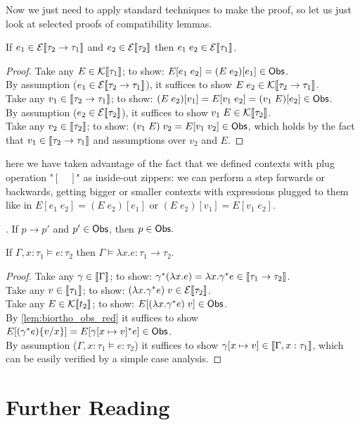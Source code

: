 Now we just need to apply standard techniques to make the proof, so let us just
look at selected proofs of compatibility lemmas.
\begin{lemma}
  If $e_1 \in \mathcal{E}\llbracket\tau_2 \to \tau_1\rrbracket$
  and $e_2 \in \mathcal{E}\llbracket\tau_2\rrbracket$
  then $e_1\;e_2 \in \mathcal{E}\llbracket\tau_1\rrbracket$.
\end{lemma}
\begin{proof}
  Take any $E \in \mathcal{K}\llbracket\tau_1\rrbracket$;
    to show: $E[e_1\;e_2] = (E\;e_2)[e_1] \in \mathsf{Obs}$. \\
  By assumption ($e_1 \in \mathcal{E}\llbracket\tau_2 \to \tau_1\rrbracket$),
    it suffices to show $E\;e_2 \in \mathcal{K}\llbracket\tau_2 \to \tau_1\rrbracket$. \\
  Take any $v_1 \in \llbracket\tau_2 \to \tau_1\rrbracket$;
    to show: $(E\;e_2)[v_1] = E[v_1\;e_2] = (v_1\;E)[e_2] \in \mathsf{Obs}$. \\
  By assumption ($e_2 \in \mathcal{E}\llbracket\tau_2\rrbracket$),
    it suffices to show $v_1\;E\in\mathcal{K}\llbracket\tau_2\rrbracket$. \\
  Take any $v_2 \in \llbracket\tau_2\rrbracket$;
    to show: $(v_1\;E)\;v_2 = E[v_1\;v_2] \in \mathsf{Obs}$, which holds
    by the fact that $v_1\in\llbracket\tau_2\to\tau_1\rrbracket$
    and assumptions over $v_2$ and $E$.
\end{proof}
here we have taken advantage of the fact that we defined contexts with
plug operation "$[ \quad ]$" as inside-out zippers: we can perform a step
forwards or backwards, getting bigger or smaller contexts with expressions
plugged to them like in $E[e_1\;e_2] = (E\;e_2)[e_1]$ or
$(E\;e_2)[v_1] = E[v_1\;e_2]$.

\begin{lemma}\label{lem:biortho_obs_red}.
  If $p \longrightarrow p'$ and $p' \in \mathsf{Obs}$, then $p \in \mathsf{Obs}.$
\end{lemma}

\begin{lemma}
  If $\Gamma,x : \tau_1 \models e : \tau_2$
  then $\Gamma\models \lambda x.e : \tau_1 \to \tau_2$.
\end{lemma}
\begin{proof}
  Take any $\gamma \in \llbracket\Gamma\rrbracket$;
    to show: $\gamma^*(\lambda x.e) =
      \lambda x.\gamma^* e \in \llbracket\tau_1 \to \tau_2\rrbracket$. \\
  Take any $v \in \llbracket\tau_1\rrbracket$;
    to show: $(\lambda x.\gamma^* e)\;v \in \mathcal{E}\llbracket\tau_2\rrbracket$.\\
  Take any $E \in \mathcal{K}\llbracket t_2\rrbracket$;
    to show: $E[(\lambda x.\gamma^* e)\;v] \in \mathsf{Obs}$.\\
  By \autoref{lem:biortho_obs_red} it suffices to show
    $E[(\gamma^* e)\{v/x\}] = E[\gamma[x\mapsto v]^* e] \in \mathsf{Obs}$. \\
  By assumption ($\Gamma,x : \tau_1\models e : \tau_2$)
    it suffices to show $\gamma[x\mapsto v] \in \llbracket\Gamma,x : \tau_1\rrbracket$,
    which can be easily verified by a simple case analysis.
\end{proof}

\section{Further Reading}


